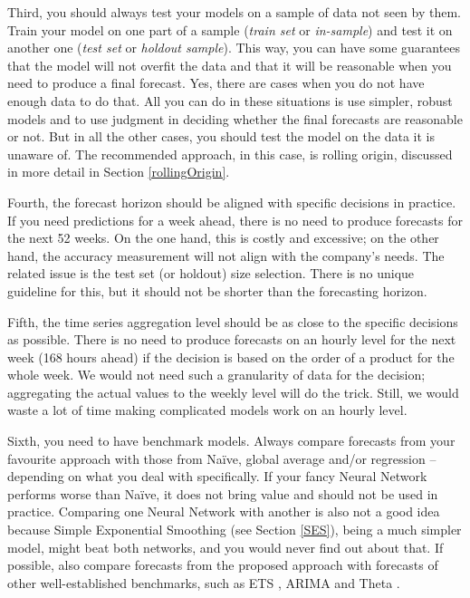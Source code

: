 \documentclass[]{book}
\theoremstyle{definition}
\theoremstyle{definition}
\theoremstyle{definition}
\theoremstyle{definition}
\theoremstyle{remark}
\begin{document}
Third, you should always test your models on a sample of data not seen by them. Train your model on one part of a sample (\emph{train set} or \emph{in-sample}) and test it on another one (\emph{test set} or \emph{holdout sample}). This way, you can have some guarantees that the model will not overfit the data and that it will be reasonable when you need to produce a final forecast. Yes, there are cases when you do not have enough data to do that. All you can do in these situations is use simpler, robust models \citetext{\citealp[for example, damped trend exponential smoothing by][]{Roberts1982}; \citealp[and][]{Gardner1985a}; \citealp[or Theta by][]{Assimakopoulos2000}} and to use judgment in deciding whether the final forecasts are reasonable or not. But in all the other cases, you should test the model on the data it is unaware of. The recommended approach, in this case, is rolling origin, discussed in more detail in Section \ref{rollingOrigin}.

Fourth, the forecast horizon should be aligned with specific decisions in practice. If you need predictions for a week ahead, there is no need to produce forecasts for the next 52 weeks. On the one hand, this is costly and excessive; on the other hand, the accuracy measurement will not align with the company's needs. The related issue is the test set (or holdout) size selection. There is no unique guideline for this, but it should not be shorter than the forecasting horizon.

Fifth, the time series aggregation level should be as close to the specific decisions as possible. There is no need to produce forecasts on an hourly level for the next week (168 hours ahead) if the decision is based on the order of a product for the whole week. We would not need such a granularity of data for the decision; aggregating the actual values to the weekly level will do the trick. Still, we would waste a lot of time making complicated models work on an hourly level.

Sixth, you need to have benchmark models. Always compare forecasts from your favourite approach with those from Naïve, global average and/or regression -- depending on what you deal with specifically. If your fancy Neural Network performs worse than Naïve, it does not bring value and should not be used in practice. Comparing one Neural Network with another is also not a good idea because Simple Exponential Smoothing (see Section \ref{SES}), being a much simpler model, might beat both networks, and you would never find out about that. If possible, also compare forecasts from the proposed approach with forecasts of other well-established benchmarks, such as ETS \citep{Hyndman2008b}, ARIMA \citep{Box1976} and Theta \citep{Assimakopoulos2000}.
\end{document}

